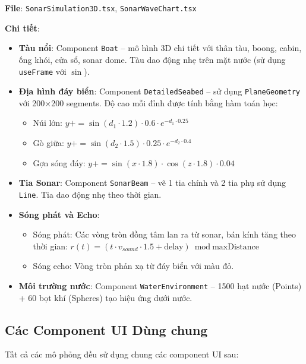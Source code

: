 \textbf{File}: \texttt{SonarSimulation3D.tsx}, \texttt{SonarWaveChart.tsx}

\textbf{Chi tiết}:

\begin{itemize}
    \item \textbf{Tàu nổi}: Component \texttt{Boat} – mô hình 3D chi tiết với thân tàu, boong, cabin, ống khói, cửa sổ, sonar dome. Tàu dao động nhẹ trên mặt nước (sử dụng \texttt{useFrame} với $\sin$).
    
    \item \textbf{Địa hình đáy biển}: Component \texttt{DetailedSeabed} – sử dụng \texttt{PlaneGeometry} với 200×200 segments. Độ cao mỗi đỉnh được tính bằng hàm toán học:
    \begin{itemize}
        \item Núi lớn: $y += \sin(d_1 \cdot 1.2) \cdot 0.6 \cdot e^{-d_1 \cdot 0.25}$
        \item Gò giữa: $y += \sin(d_2 \cdot 1.5) \cdot 0.25 \cdot e^{-d_2 \cdot 0.4}$
        \item Gợn sóng đáy: $y += \sin(x \cdot 1.8) \cdot \cos(z \cdot 1.8) \cdot 0.04$
    \end{itemize}
    
    \item \textbf{Tia Sonar}: Component \texttt{SonarBeam} – vẽ 1 tia chính và 2 tia phụ sử dụng \texttt{Line}. Tia dao động nhẹ theo thời gian.
    
    \item \textbf{Sóng phát và Echo}: 
    \begin{itemize}
        \item Sóng phát: Các vòng tròn đồng tâm lan ra từ sonar, bán kính tăng theo thời gian: $r(t) = (t \cdot v_{sound} \cdot 1.5 + \text{delay}) \bmod \text{maxDistance}$
        \item Sóng echo: Vòng tròn phản xạ từ đáy biển với màu đỏ.
    \end{itemize}
    
    \item \textbf{Môi trường nước}: Component \texttt{WaterEnvironment} – 1500 hạt nước (Points) + 60 bọt khí (Spheres) tạo hiệu ứng dưới nước.
\end{itemize}

\subsection{Các Component UI Dùng chung}

Tất cả các mô phỏng đều sử dụng chung các component UI sau:

